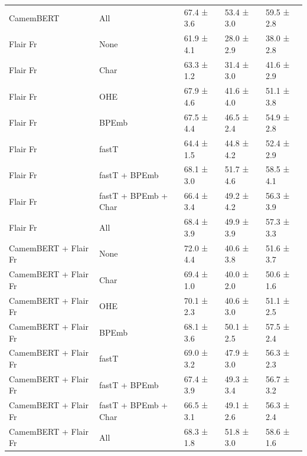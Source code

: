 \documentclass[12pt,a4paper,]{book}
\begin{document}
\begin{longtable}[t]{lllll}
\hspace{1em}CamemBERT & All & 67.4 ±  3.6 & 53.4 ±  3.0 & 59.5 ±  2.8\\
\hspace{1em}Flair Fr & None & 61.9 ±  4.1 & 28.0 ±  2.9 & 38.0 ±  2.8\\
\hspace{1em}Flair Fr & Char & 63.3 ±  1.2 & 31.4 ±  3.0 & 41.6 ±  2.9\\
\hspace{1em}Flair Fr & OHE & 67.9 ±  4.6 & 41.6 ±  4.0 & 51.1 ±  3.8\\
\hspace{1em}Flair Fr & BPEmb & 67.5 ±  4.4 & 46.5 ±  2.4 & 54.9 ±  2.8\\
\hspace{1em}Flair Fr & fastT & 64.4 ±  1.5 & 44.8 ±  4.2 & 52.4 ±  2.9\\
\hspace{1em}Flair Fr & fastT + BPEmb & 68.1 ±  3.0 & 51.7 ±  4.6 & 58.5 ±  4.1\\
\hspace{1em}Flair Fr & fastT + BPEmb + Char & 66.4 ±  3.4 & 49.2 ±  4.2 & 56.3 ±  3.9\\
\hspace{1em}Flair Fr & All & 68.4 ±  3.9 & 49.9 ±  3.9 & 57.3 ±  3.3\\
\hspace{1em}CamemBERT + Flair Fr & None & 72.0 ±  4.4 & 40.6 ±  3.8 & 51.6 ±  3.7\\
\hspace{1em}CamemBERT + Flair Fr & Char & 69.4 ±  1.0 & 40.0 ±  2.0 & 50.6 ±  1.6\\
\hspace{1em}CamemBERT + Flair Fr & OHE & 70.1 ±  2.3 & 40.6 ±  3.0 & 51.1 ±  2.5\\
\hspace{1em}CamemBERT + Flair Fr & BPEmb & 68.1 ±  3.6 & 50.1 ±  2.5 & 57.5 ±  2.4\\
\hspace{1em}CamemBERT + Flair Fr & fastT & 69.0 ±  3.2 & 47.9 ±  3.0 & 56.3 ±  2.3\\
\hspace{1em}CamemBERT + Flair Fr & fastT + BPEmb & 67.4 ±  3.9 & 49.3 ±  3.4 & 56.7 ±  3.2\\
\hspace{1em}CamemBERT + Flair Fr & fastT + BPEmb + Char & 66.5 ±  3.1 & 49.1 ±  2.6 & 56.3 ±  2.4\\
\hspace{1em}CamemBERT + Flair Fr & All & 68.3 ±  1.8 & 51.8 ±  3.0 & 58.6 ±  1.6\\

\end{longtable}
\end{document}
